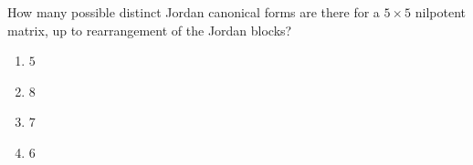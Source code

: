 \documentclass{article}
\begin{document}
\noindent
\begin{minipage}{0.65\linewidth}
How many possible distinct Jordan canonical forms are there for a $5 \times 5$ nilpotent matrix, up to rearrangement of the Jordan blocks?
\end{minipage}

\begin{enumerate}
  \item $5$
  \item $8$
  \item $7$
  \item $6$
\end{enumerate}
\end{document}
